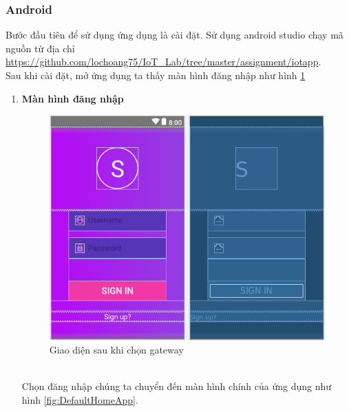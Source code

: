 \documentclass[a4paper]{article}
\begin{document}
	\subsubsection{Android}
	Bước đầu tiên để sử dụng ứng dụng là cài đặt. Sử dụng android studio chạy mã nguồn từ địa chỉ \url{https://github.com/lochoang75/IoT_Lab/tree/master/assignment/iotapp}.\\
	Sau khi cài đặt, mở ứng dụng ta thấy màn hình đăng nhập như hình \ref{fig:LoginActivityApp}\\
	\begin{enumerate}
	\item \textbf{Màn hình đăng nhập}\\
	\begin{figure}[htp]
       		\centering
       		\includegraphics[scale=0.5]{LoginActivity.png}
        		\caption{Giao diện sau khi chọn gateway}
       		 \label{fig:LoginActivityApp}
    	\end{figure}\\
	Chọn đăng nhập chúng ta chuyển đến màn hình chính của ứng dụng như hình \ref{fig:DefaultHomeApp}.\\
	

\end{enumerate}
\end{document}
